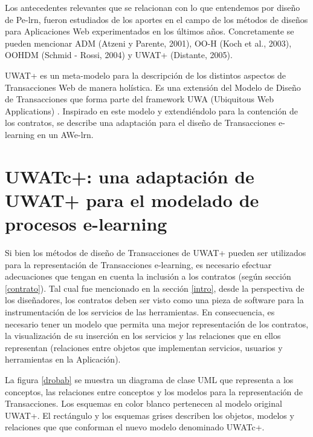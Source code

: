 Los antecedentes relevantes que se relacionan con lo que entendemos por diseño
de Pe-lrn, fueron estudiados de los aportes en el campo de los métodos de
diseños para Aplicaciones Web experimentados en los últimos años. Concretamente
se pueden mencionar ADM (Atzeni y Parente, 2001), OO-H (Koch et al., 2003),
OOHDM (Schmid - Rossi, 2004) y UWAT+ (Distante, 2005).

UWAT+ es un meta-modelo para la descripción de los distintos aspectos de
Transacciones Web de manera holística. Es una extensión del Modelo de Diseño de
Transacciones que forma  parte del framework UWA (Ubiquitous Web Applications)
\cite{UWA}. Inspirado en este modelo y extendiéndolo para la contención de los
contratos, se describe una adaptación para el diseño de Transacciones e-learning
en un AWe-lrn.

\section {UWATc+: una adaptación de UWAT+ para el modelado de procesos
e-learning} \label{uwatc}

Si bien los métodos de diseño de Transacciones de UWAT+ pueden ser utilizados
para la representación de Transacciones e-learning, es necesario efectuar
adecuaciones que tengan en cuenta la inclusión a los contratos (según sección
\ref{contrato}). Tal cual fue mencionado en la sección \ref{intro}, desde la
perspectiva de los diseñadores, los contratos deben ser visto como una pieza de
software para la instrumentación de los servicios de las herramientas. En
consecuencia, es necesario tener un modelo que permita una mejor representación
de los contratos, la visualización de su inserción en los servicios y las
relaciones que en ellos representan (relaciones entre objetos que implementan
servicios, usuarios y herramientas en la Aplicación). 


La figura \ref{drobab} se muestra un diagrama de clase UML que representa a los
conceptos, las relaciones entre conceptos y los modelos para la representación
de Transacciones. Los esquemas en color blanco pertenecen al modelo original
UWAT+. El rectángulo y los esquemas grises describen los objetos, modelos y
relaciones que  que conforman el nuevo modelo denominado UWATc+.

